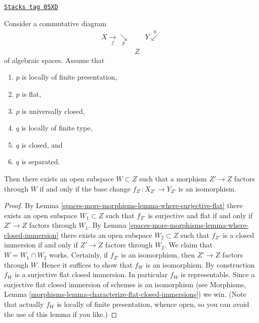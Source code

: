 \begin{lemma}
\label{spaces-more-morphisms-lemma-where-isomorphism}
\href{https://stacks.math.columbia.edu/tag/05XD}{\texttt{Stacks tag 05XD}}

Consider a commutative diagram
$$
\begin{array}{ccc}X \underset{f}{\longrightarrow}\underset{p}{\searrow} &  & Y \overset{q}{\swarrow} \\  & Z & \end{array}
$$
of algebraic spaces. Assume that
\begin{enumerate}
\item $p$ is locally of finite presentation,
\item $p$ is flat,
\item $p$ is universally closed,
\item $q$ is locally of finite type,
\item $q$ is closed, and
\item $q$ is separated.
\end{enumerate}
Then there exists an open subspace $W \subset Z$
such that a morphism $Z' \to Z$ factors through $W$ if and only if the
base change $f_{Z'} : X_{Z'} \to Y_{Z'}$ is an isomorphism.
\end{lemma}

\begin{proof}
By
Lemma \ref{spaces-more-morphisms-lemma-where-surjective-flat}
there exists an open subspace $W_1 \subset Z$ such that
$f_{Z'}$ is surjective and flat if and only if $Z' \to Z$
factors through $W_1$. By
Lemma \ref{spaces-more-morphisms-lemma-where-closed-immersion}
there exists an open subspace $W_2 \subset Z$ such that
$f_{Z'}$ is a closed immersion if and only if $Z' \to Z$
factors through $W_2$. We claim that $W = W_1 \cap W_2$ works.
Certainly, if $f_{Z'}$ is an isomorphism, then $Z' \to Z$
factors through $W$. Hence it suffices to show that
$f_W$ is an isomorphism. By construction $f_W$ is a
surjective flat closed immersion. In particular $f_W$ is
representable. Since a surjective flat closed immersion of
schemes is an isomorphism (see
Morphisms, Lemma \ref{morphisms-lemma-characterize-flat-closed-immersions})
we win. (Note that actually $f_W$ is locally of finite presentation,
whence open, so you can avoid the use of this lemma if you like.)
\end{proof}

